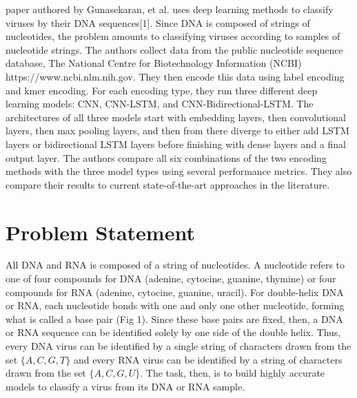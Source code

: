 \documentclass[journal]{IEEEtran}
\begin{document}
   paper authored by Gunasekaran, et al. uses deep learning methods 
  to classify viruses by their DNA sequences[1]. Since DNA is composed of strings
  of nucleotides, the problem amounts to classifying viruses according to samples of nucleotide
  strings. The authors collect data from the public nucleotide sequence database,
  The National Centre for Biotechnology Information (NCBI) https://www.ncbi.nlm.nih.gov.
  They then encode this data using label encoding and kmer encoding. For each encoding type,
  they run three different deep learning models: CNN, CNN-LSTM, and CNN-Bidirectional-LSTM.
  The architectures of all three models start with embedding layers, then convolutional layers,
  then max pooling layers, and then from there diverge to either add LSTM layers or 
  bidirectional LSTM layers before finishing with dense layers and a final output layer.
  The authors compare all six combinations of the two encoding methods with the three model types
  using several performance metrics. They also compare their results to current state-of-the-art
  approaches in the literature.

\section{Problem Statement}
  All DNA and RNA is composed of a string of nucleotides. A nucleotide refers to one of
  four compounds for DNA (adenine, cytocine, guanine, thymine) or four compounds for RNA
  (adenine, cytocine, guanine, uracil). For double-helix DNA or RNA, each nucleotide
  bonds with one and only one other nucleotide, forming what is called a base pair (Fig 1). Since
  these base pairs are fixed, then, a DNA or RNA sequence can be identified solely by one
  side of the double helix. Thus, every DNA virus can be identified by a single string of
  characters drawn from the set $\{A, C, G, T\}$ and every RNA virus can be identified by a string
  of characters drawn from the set $\{A, C, G, U\}$. The task, then, is to build highly accurate
  models to classify a virus from its DNA or RNA sample.
\end{document}

